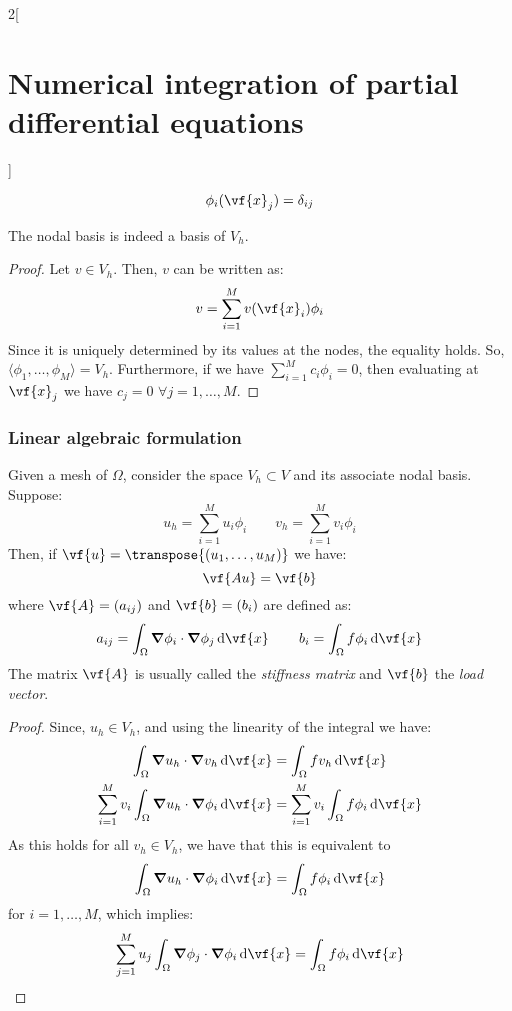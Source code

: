 \documentclass[../../../main_math.tex]{subfiles}
\begin{document}
\begin{multicols}{2}[\section{Numerical integration of partial differential equations}]
\begin{definition}
    $$\phi_i(\vf{x}_j)=\delta_{ij}$$
  \end{definition}
  \begin{lemma}
    The nodal basis is indeed a basis of $V_h$.
  \end{lemma}
  \begin{proof}
    Let $v\in V_h$. Then, $v$ can be written as:
    $$
      v=\sum_{i=1}^M v(\vf{x}_i)\phi_i
    $$
    Since it is uniquely determined by its values at the nodes, the equality holds.
    So, $\langle \phi_1, \ldots, \phi_M\rangle=V_h$. Furthermore, if we have $\sum_{i=1}^M c_i\phi_i=0$, then evaluating at $\vf{x}_j$ we have $c_j=0$ $\forall j=1,\ldots,M$.
  \end{proof}
  \subsubsection{Linear algebraic formulation}
  \begin{proposition}
    Given a mesh of $\Omega$, consider the space $V_h\subset V$ and its associate nodal basis. Suppose:
    $$
      u_h=\sum_{i=1}^M u_i\phi_i\qquad v_h=\sum_{i=1}^M v_i\phi_i
    $$
    Then, if $\vf{u}=\transpose{(u_1,\ldots,u_M)}$ we have:
    $$\vf{Au}=\vf{b}$$
    where $\vf{A}=(a_{ij})$ and $\vf{b}=(b_i)$ are defined as:
    \begin{equation*}
      a_{ij} =\int_\Omega \grad{\phi_i}\cdot\grad{\phi_j}\dd{\vf{x}} \qquad b_i    =\int_\Omega f\phi_i\dd{\vf{x}}
    \end{equation*}
    The matrix $\vf{A}$ is usually called the \emph{stiffness matrix} and $\vf{b}$ the \emph{load vector}.
  \end{proposition}
  \begin{proof}
    Since, $u_h\in V_h$, and using the linearity of the integral we have:
    \begin{align*}
      \int_\Omega \grad{u_h}\cdot\grad{v_h}\dd{\vf{x}}                     & =\int_\Omega f v_h\dd{\vf{x}}                    \\
      \sum_{i=1}^M v_i \int_\Omega \grad{u_h}\cdot\grad{\phi_i}\dd{\vf{x}} & =\sum_{i=1}^M v_i \int_\Omega f\phi_i\dd{\vf{x}}
    \end{align*}
    As this holds for all $v_h\in V_h$, we have that this is equivalent to
    $$\int_\Omega \grad{u_h}\cdot\grad{\phi_i}\dd{\vf{x}} =\int_\Omega f\phi_i\dd{\vf{x}}$$
    for $i=1,\ldots,M$, which implies:
    $$\sum_{j=1}^M u_j \int_\Omega \grad{\phi_j}\cdot\grad{\phi_i}\dd{\vf{x}} =\int_\Omega f\phi_i\dd{\vf{x}}$$
  \end{proof}

\end{multicols}
\end{document}
